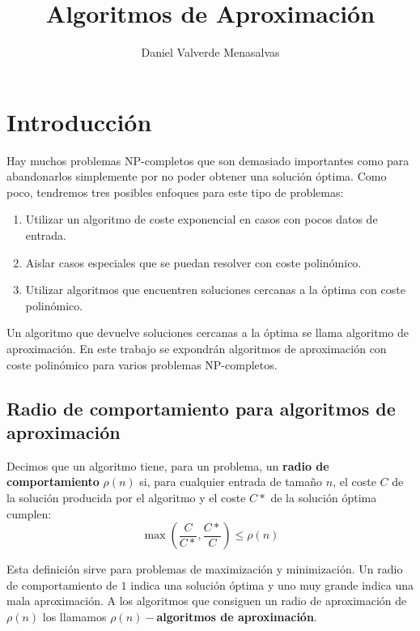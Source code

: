 \documentclass{article}
\begin{document}
\sloppy
\title{Algoritmos de Aproximaci\'on}

\author{Daniel Valverde Menasalvas}

\maketitle


\section{Introducción}
\label{sec:introduction}
Hay muchos problemas NP-completos que son demasiado importantes como para abandonarlos simplemente por no poder obtener una soluci\'on \'optima. Como poco, tendremos tres posibles enfoques para este tipo de problemas: 
\begin{enumerate}
	\item Utilizar un algoritmo de coste exponencial en casos con pocos datos de entrada.
	\item Aislar casos especiales que se puedan resolver con coste polin\'omico.
	\item Utilizar algoritmos que encuentren soluciones cercanas a la \'optima con coste polin\'omico.
\end{enumerate}

Un algoritmo que devuelve soluciones cercanas a la \'optima se llama algoritmo de aproximaci\'on. En este trabajo se expondrán algoritmos de aproximaci\'on con coste polin\'omico para varios problemas NP-completos.\\

\subsection{Radio de comportamiento para algoritmos de aproximaci\'on}
Decimos que un algoritmo tiene, para un problema, un \textbf{radio de comportamiento} $\rho(n)$ si, para cualquier entrada de tamaño $n$, el coste $C$ de la soluci\'on producida por el algoritmo y el coste $C*$
 de la soluci\'on \'optima cumplen: 
\[
	\max(\frac{C}{C*}, \frac{C*}{C}) \leq \rho(n)
\]


Esta definici\'on sirve para problemas de maximizaci\'on y minimizaci\'on. Un radio de comportamiento de $1$ indica una soluci\'on \'optima y uno muy grande indica una mala aproximaci\'on. A los algoritmos que consiguen un radio de aproximaci\'on de $\rho(n)$ los llamamos \textbf{$\rho(n)-$algoritmos de aproximaci\'on}.\\
\end{document}
